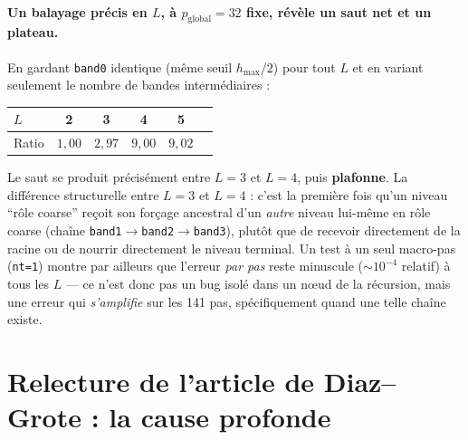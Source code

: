 \documentclass[11pt]{article}
\newcommand{\code}[1]{\texttt{#1}}
\begin{document}
\paragraph{Un balayage précis en $L$, à $p_{\text{global}}=32$ fixe,
révèle un saut net et un plateau.} En gardant \code{band0} identique
(même seuil $h_{\max}/2$) pour tout $L$ et en variant seulement le
nombre de bandes intermédiaires :
\begin{center}
\begin{tabular}{@{}lccccc@{}}
\toprule
$L$ & 2 & 3 & 4 & 5 \\
\midrule
Ratio & $1{,}00$ & $2{,}97$ & $9{,}00$ & $9{,}02$ \\
\bottomrule
\end{tabular}
\end{center}
Le saut se produit précisément entre $L=3$ et $L=4$, puis
\textbf{plafonne}. La différence structurelle entre $L=3$ et $L=4$ :
c'est la première fois qu'un niveau ``rôle coarse'' reçoit son
forçage ancestral d'un \emph{autre} niveau lui-même en rôle coarse
(chaîne \code{band1}$\to$\code{band2}$\to$\code{band3}), plutôt que de
recevoir directement de la racine ou de nourrir directement le niveau
terminal. Un test à un seul macro-pas (\code{nt=1}) montre par ailleurs
que l'erreur \emph{par pas} reste minuscule ($\sim 10^{-4}$ relatif) à
tous les $L$ --- ce n'est donc pas un bug isolé dans un nœud de la
récursion, mais une erreur qui \emph{s'amplifie} sur les 141 pas,
spécifiquement quand une telle chaîne existe.

\section{Relecture de l'article de Diaz--Grote : la cause profonde}
\label{sec:groteread}
\end{document}
